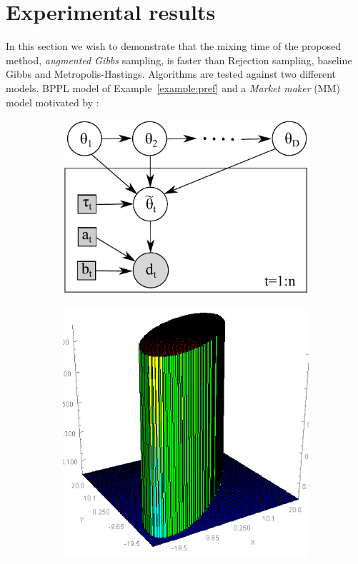 \section{Experimental results}
\label{sect:experiment}

In this section we wish to demonstrate that the mixing time of the proposed method, \emph{augmented Gibbs} sampling, is faster than Rejection sampling, baseline Gibbs and Metropolis-Hastings.     
Algorithms are tested against two different models.  BPPL model of Example~\ref{example:pref} and a \emph{Market maker} (MM) model motivated by \cite{Das:08}:

\begin{figure}
\centering
\begin{subfigure}{.35\textwidth}
\centering
\includegraphics[width=.90\textwidth]{pic/market4w.pdf}
\caption{}%
\label{fig:market}
\end{subfigure}
\begin{subfigure}{.24\textwidth}%
  \centering
  \includegraphics[width=.95\textwidth]{pic/elipsePrior.png}

\end{subfigure}
\end{figure}
